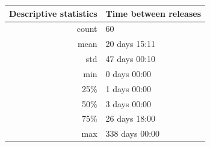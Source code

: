 \begin{multicols}{3}
	\noindent
	\begin{minipage}{\columnwidth + \columnsep}
		\begin{tabular}{|r|l|}
			\hline
			Descriptive statistics & Time between releases \\
			\hline
			count                  & 60                    \\
			mean                   & 20 days 15:11         \\
			std                    & 47 days 00:10         \\
			min                    & 0 days 00:00          \\
			25\%                   & 1 days 00:00          \\
			50\%                   & 3 days 00:00          \\
			75\%                   & 26 days 18:00         \\
			max                    & 338 days 00:00        \\
			\hline
		\end{tabular}
	\end{minipage}

	\columnbreak %

	\noindent
	\begin{minipage}{\columnwidth}
	\end{minipage}

\end{multicols}

